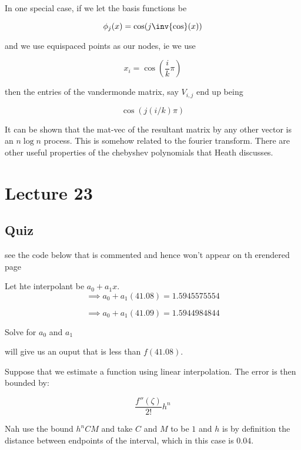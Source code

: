 \documentclass[../main.tex]{subfiles}
\begin{document}
\begin{definition}
    In one special case, if we let the basis functions be

    \[
        \phi_j(x) = \cos(j \inv{\cos}(x))
    \]

    and we use equispaced points as our nodes, ie we use

    \[
        x_i = \cos\left( \frac{i}{k}\pi \right)
    \]

    then the entries of the vandermonde matrix, say $V_{i,j}$ end up being

    \[
        \cos\left( j(i/k)\pi \right)
    \]

    It can be shown that the mat-vec of the resultant matrix by any other vector is an $n \log n$ process. This is somehow related to the fourier transform. There are other useful properties of the chebyshev polynomials that Heath discusses.
\end{definition}

\section{Lecture 23}
\subsection{Quiz}


see the code below that is commented and hence won't appear on th erendered page

Let hte interpolant be $a_0 + a_1 x$.
\[
    \implies a_0 + a_1(41.08) = 1.5945575554
\]

\[
    \implies a_0 + a_1(41.09) = 1.5944984844
\]

Solve for $a_0$ and $a_1$



will give us an ouput that is less than $f(41.08)$.
\[
    
\]

Suppose that we estimate a function using linear interpolation. The error is then bounded by:

\[
    \frac{f''(\zeta)}{2!}h^n
\]

Nah use the bound $h^n C M$ and take $C$ and $M$ to be $1$ and $h$ is by definition the distance between endpoints of the interval, which in this case is $0.04$.
\end{document}
